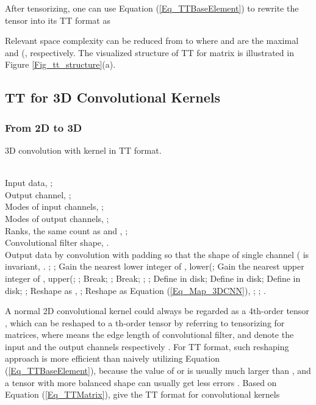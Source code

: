 \documentclass[a4paper,fleqn]{cas-dc}
\begin{document}
After tensorizing, one can use Equation (\ref{Eq_TTBaseElement}) to rewrite the tensor  into its TT format as

Relevant space complexity can be reduced from  to  where  and  are the maximal  and  (, respectively. The visualized structure of TT for matrix     is illustrated in Figure \ref{Fig_tt_structure}(a).

\subsection{TT for 3D Convolutional Kernels}

\subsubsection{From 2D to 3D}\quad

\begin{algorithm}[htb] 
\caption{3D convolution with kernel in TT format.}
\label{Alg_TT_3DCNN} 
\begin{algorithmic}[1]
\REQUIRE ~~\\
Input data, ;\\
Output channel, ;\\
Modes of input channels, ;\\
Modes of output channels, ;\\
Ranks, the same count as  and , ;\\
Convolutional filter shape, .
\ENSURE ~~\\
Output data by convolution with padding so that the shape of single channel ( is invariant, .
\STATE ;
\STATE ;
\STATE Gain the nearest lower integer of ,  lower(;
\STATE Gain the nearest upper integer of ,  upper(;
\IF{}
\STATE ;
\STATE Break;
\ELSIF{}
\STATE ;
\STATE Break;
\ELSE
\STATE ;
\STATE ;
\ENDIF
\ENDWHILE
\STATE Define  in disk;
\FOR{}
\STATE Define  in disk;
\ENDFOR
\STATE Define  in disk;
\STATE ;
\STATE Reshape as \citep{Garipov_2016_TTCNN}, ;
\STATE Reshape as Equation (\ref{Eq_Map_3DCNN}), ;
\STATE ;
\RETURN .
\end{algorithmic}
\end{algorithm}

A normal 2D convolutional kernel could always be regarded as a 4th-order tensor , which can be reshaped to a th-order tensor   by referring to tensorizing for matrices, where  means the edge length of convolutional filter,  and  denote the input and the output channels respectively \citep{Garipov_2016_TTCNN}. For TT format, such reshaping approach is more efficient than naively utilizing Equation (\ref{Eq_TTBaseElement}), because the value of  or  is usually much larger than , and a tensor with more balanced shape can usually get less errors \citep{Novikov_2015_TT}. Based on Equation (\ref{Eq_TTMatrix}), \citet{Garipov_2016_TTCNN} give the TT format for convolutional kernels
\end{document}
